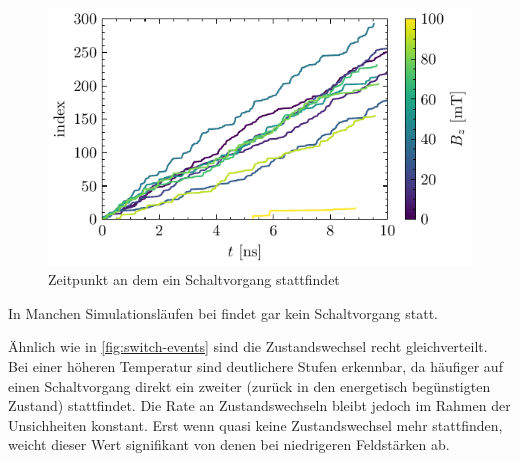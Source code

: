 \documentclass[main.tex]{subfiles}
\begin{document}
\begin{figure}[H]
    \centering
    \includegraphics{bilder/plots/max_Bz/switch_events.pdf}
    \caption{Zeitpunkt an dem ein Schaltvorgang stattfindet}\label{fig:bc-switch-events}   
\end{figure}


In Manchen Simulationsläufen bei  findet gar kein Schaltvorgang statt.


Ähnlich wie in \cref{fig:switch-events} sind die Zustandswechsel recht gleichverteilt. Bei einer höheren Temperatur sind deutlichere Stufen erkennbar, da häufiger auf einen Schaltvorgang direkt ein zweiter (zurück in den energetisch begünstigten Zustand) stattfindet. Die Rate an Zustandswechseln bleibt jedoch im Rahmen der Unsichheiten konstant. Erst wenn quasi keine Zustandswechsel mehr stattfinden, weicht dieser Wert signifikant von denen bei niedrigeren Feldstärken ab. 
\end{document}
